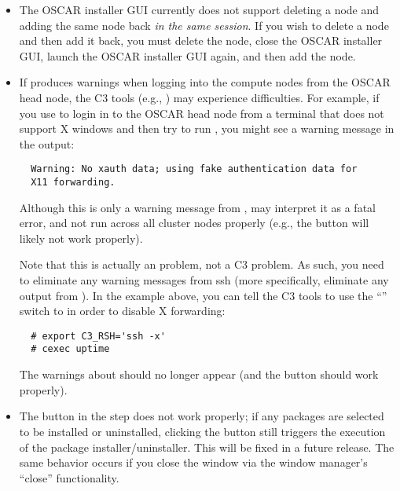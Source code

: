 \begin{itemize}
\item The OSCAR installer GUI currently does not support deleting a
  node and adding the same node back {\em in the same session}.  If
  you wish to delete a node and then add it back, you must delete the
  node, close the OSCAR installer GUI, launch the OSCAR installer GUI
  again, and then add the node.


\begchange
\item If  produces warnings when logging into the compute
  nodes from the OSCAR head node, the C3 tools (e.g., ) may
  experience difficulties.  For example, if you use  to login
  in to the OSCAR head node from a terminal that does not support X
  windows and then try to run , you might see a warning
  message in the  output:

\begin{verbatim}
  Warning: No xauth data; using fake authentication data for 
  X11 forwarding.
\end{verbatim}
  
  Although this is only a warning message from , 
  may interpret it as a fatal error, and not run across all cluster
  nodes properly (e.g., the  button
  will likely not work properly).

  Note that this is actually an  problem, not a C3 problem.
  As such, you need to eliminate any warning messages from ssh (more
  specifically, eliminate any output from ).  In the
  example above, you can tell the C3 tools to use the ``''
  switch to  in order to disable X forwarding:

\begin{verbatim}
  # export C3_RSH='ssh -x'
  # cexec uptime
\end{verbatim}
  
  The warnings about  should no longer appear (and the
   button should work properly).
  
\item The  button in the  step does not work properly; if any packages are selected
  to be installed or uninstalled, clicking the  button
  still triggers the execution of the package installer/uninstaller.
  This will be fixed in a future release.  The same behavior occurs if
  you close the window via the window manager's ``close''
  functionality.


\end{itemize}
